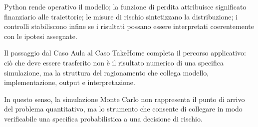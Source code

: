 Python rende operativo il modello; la funzione di perdita attribuisce
significato finanziario alle traiettorie; le misure di rischio sintetizzano
la distribuzione; i controlli stabiliscono infine se i risultati possano
essere interpretati coerentemente con le ipotesi assegnate.

Il passaggio dal Caso Aula al Caso TakeHome completa il percorso applicativo:
ci\`o che deve essere trasferito non \`e il risultato numerico di una
specifica simulazione, ma la struttura del ragionamento che collega modello,
implementazione, output e interpretazione.

In questo senso, la simulazione Monte Carlo non rappresenta il punto di
arrivo del problema quantitativo, ma lo strumento che consente di collegare
in modo verificabile una specifica probabilistica a una decisione di rischio.
%